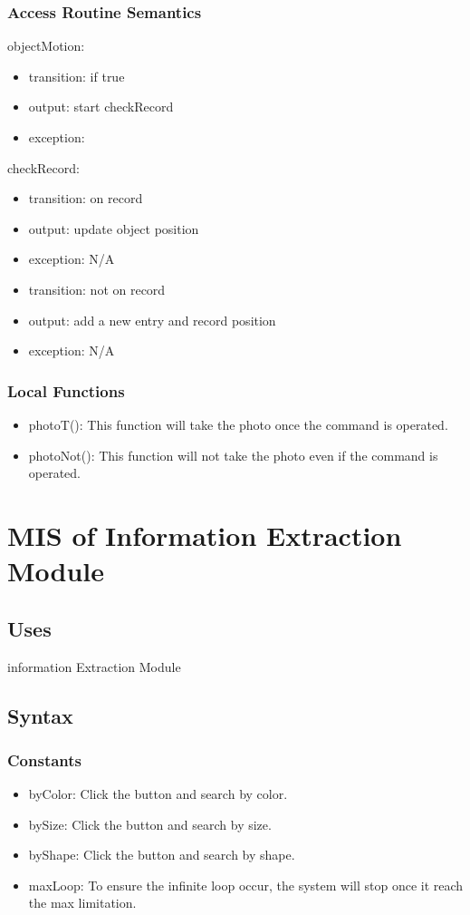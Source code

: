 \documentclass[12pt, titlepage]{article}
\begin{document}
\subsubsection{Access Routine Semantics}

\noindent objectMotion:
\begin{itemize}
\item transition: if true 
\item output: start checkRecord
\item exception: 
\end{itemize}

\noindent checkRecord:
\begin{itemize}
\item transition: on record
\item output: update object position
\item exception: N/A
\item transition: not on record
\item output: add a new entry and record position
\item exception: N/A
\end{itemize}


\subsubsection{Local Functions}
\begin{itemize}
\item photoT(): This function will take the photo once the command is operated.
\item photoNot(): This function will not take the photo even if the command is operated.
\end{itemize}
\newpage
\section{MIS of Information Extraction Module} 



\subsection{Uses}
information Extraction Module

\subsection{Syntax}

\subsubsection{Constants}
\begin{itemize}
\item byColor: Click the button and search by color.
\item bySize: Click the button and search by size.
\item byShape: Click the button and search by shape.
\item maxLoop: To ensure the infinite loop occur, the system will stop once it reach the max limitation.
\end{itemize}
\end{document}
